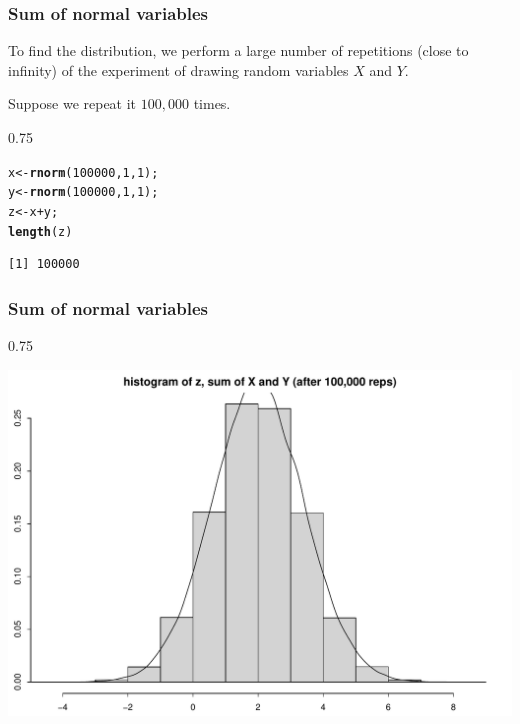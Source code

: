 \documentclass{beamer}\usepackage[]{graphicx}\usepackage[]{color}
\makeatletter
\newcommand{\hlnum}[1]{\textcolor[rgb]{0.2,0.2,0.2}{#1}}%
\newcommand{\hlopt}[1]{\textcolor[rgb]{0.102,0.102,0.102}{#1}}%
\newcommand{\hlstd}[1]{\textcolor[rgb]{0.102,0.102,0.102}{#1}}%
\newcommand{\hlkwb}[1]{\textcolor[rgb]{0.102,0.102,0.102}{#1}}%
\newcommand{\hlkwd}[1]{\textcolor[rgb]{0.102,0.102,0.102}{\textbf{#1}}}%
\newenvironment{kframe}{%
 \def\at@end@of@kframe{}%
 \ifinner\ifhmode%
  \def\at@end@of@kframe{\end{minipage}}%
  \begin{minipage}{\columnwidth}%
 \fi\fi%
 \def\FrameCommand##1{\hskip\@totalleftmargin \hskip-\fboxsep
 \colorbox{shadecolor}{##1}\hskip-\fboxsep
     \hskip-\linewidth \hskip-\@totalleftmargin \hskip\columnwidth}%
 \MakeFramed {\advance\hsize-\width
   \@totalleftmargin\z@ \linewidth\hsize
   \@setminipage}}%
 {\par\unskip\endMakeFramed%
 \at@end@of@kframe}
\newenvironment{knitrout}{}{} %
\renewenvironment{knitrout}{\begin{spacing}{0.75}\begin{tiny}}{\end{tiny}\end{spacing}}
\makeatother
\begin{document}
\begin{frame}[fragile]
\frametitle{Sum of normal variables}

To find the distribution, we perform a large number of repetitions (close to infinity)
of the experiment of drawing random variables $X$ and $Y$. \pause 

Suppose we repeat it $100,000$ times. \pause

\begin{knitrout}\small
{}\color{fgcolor}\begin{kframe}
\begin{alltt}
\hlstd{x} \hlkwb{<-} \hlkwd{rnorm}\hlstd{(}\hlnum{100000}\hlstd{,} \hlnum{1}\hlstd{,} \hlnum{1}\hlstd{);}
\hlstd{y} \hlkwb{<-} \hlkwd{rnorm}\hlstd{(}\hlnum{100000}\hlstd{,} \hlnum{1}\hlstd{,} \hlnum{1}\hlstd{);}
\hlstd{z} \hlkwb{<-} \hlstd{x}\hlopt{+}\hlstd{y;}
\hlkwd{length}\hlstd{(z)}
\end{alltt}
\begin{verbatim}
[1] 100000
\end{verbatim}
\end{kframe}
\end{knitrout}

\end{frame}

\begin{frame}[fragile]

\frametitle{Sum of normal variables}

\begin{knitrout}\small
{}\color{fgcolor}

{\centering \includegraphics[width=0.99\linewidth]{figure/graphics-unnamed-chunk-10-1} 

}



\end{knitrout}

\end{frame}
\end{document}
